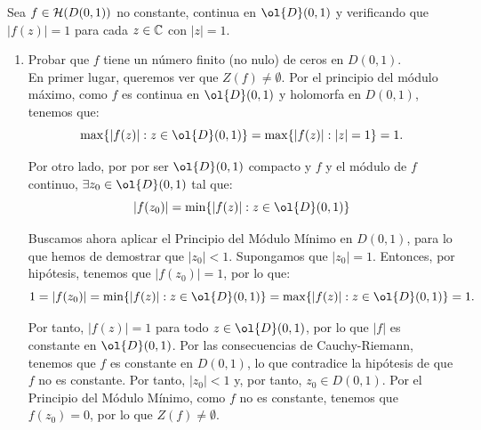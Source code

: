 \documentclass[12pt]{article}
\begin{document}
    \begin{ejercicio}[2.5 puntos]
        Sea $f \in \mathcal{H}(D(0, 1))$ no constante, continua en $\ol{D}(0, 1)$ y verificando que $|f(z)| = 1$ para cada $z \in \mathbb{C}$ con $|z| = 1$.
        \begin{enumerate}
            \item Probar que $f$ tiene un número finito (no nulo) de ceros en $D(0, 1)$.\\
            
            En primer lugar, queremos ver que $Z(f)\neq \emptyset$. Por el principio del módulo máximo, como $f$ es continua en $\ol{D}(0, 1)$ y holomorfa en $D(0, 1)$, tenemos que:
            \begin{equation*}
                \max\{|f(z)| : z \in \ol{D}(0, 1)\} = \max\{|f(z)| : |z|=1\} = 1.
            \end{equation*}

            Por otro lado, por por ser $\ol{D}(0, 1)$ compacto y $f$ y el módulo de $f$ continuo, $\exists z_0 \in \ol{D}(0, 1)$ tal que:
            \begin{equation*}
                |f(z_0)| = \min\{|f(z)| : z \in \ol{D}(0, 1)\}
            \end{equation*}

            Buscamos ahora aplicar el Principio del Módulo Mínimo en $D(0, 1)$, para lo que hemos de demostrar que $|z_0| < 1$. Supongamos que $|z_0| = 1$. Entonces, por hipótesis, tenemos que $|f(z_0)| = 1$, por lo que:
            \begin{equation*}
                1 = |f(z_0)| = \min\{|f(z)| : z \in \ol{D}(0, 1)\} = \max\{|f(z)| : z \in \ol{D}(0, 1)\} = 1.
            \end{equation*}

            Por tanto, $|f(z)| = 1$ para todo $z \in \ol{D}(0, 1)$, por lo que $|f|$ es constante en $\ol{D}(0, 1)$. Por las consecuencias de Cauchy-Riemann, tenemos que $f$ es constante en $D(0, 1)$, lo que contradice la hipótesis de que $f$ no es constante. Por tanto, $|z_0| < 1$ y, por tanto, $z_0 \in D(0, 1)$. Por el Principio del Módulo Mínimo, como $f$ no es constante, tenemos que $f(z_0) = 0$, por lo que $Z(f) \neq \emptyset$.\\


\end{enumerate}
\end{ejercicio}
\end{document}
